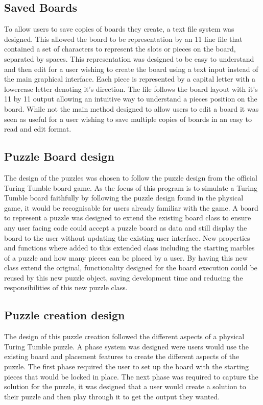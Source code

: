 \documentclass{l4proj}
\begin{document}
\subsection{Saved Boards}
To allow users to save copies of boards they create, a text file system was designed. This allowed the board to be representation by an 11 line file that contained a set of characters to represent the slots or pieces on the board, separated by spaces. This representation was designed to be easy to understand and then edit for a user wishing to create the board using a text input instead of the main graphical interface. Each piece is represented by a capital letter with a lowercase letter denoting it's direction. The file follows the board layout with it's 11 by 11 output allowing an intuitive way to understand a pieces position on the board. While not the main method designed to allow users to edit a board it was seen as useful for a user wishing to save multiple copies of boards in an easy to read and edit format.

\subsection{Puzzle Board design}
The design of the puzzles was chosen to follow the puzzle design from the official Turing Tumble board game. As the focus of this program is to simulate a Turing Tumble board faithfully by following the puzzle design found in the physical game, it would be recognisable for users already familiar with the game. A board to represent a puzzle was designed to extend the existing board class to ensure any user facing code could accept a puzzle board as data and still display the board to the user without updating the existing user interface. New properties and functions where added to this extended class including the starting marbles of a puzzle and how many pieces can be placed by a user. By having this new class extend the original, functionality designed for the board execution could be reused by this new puzzle object, saving development time and reducing the responsibilities of this new puzzle class. 

\subsection{Puzzle creation design}
The design of this puzzle creation followed the different aspects of a physical Turing Tumble puzzle. A phase system was designed were users would use the existing board and placement features to create the different aspects of the puzzle. The first phase required the user to set up the board with the starting pieces that would be locked in place. The next phase was required to capture the solution for the puzzle, it was designed that a user would create a solution to their puzzle and then play through it to get the output they wanted. 
\end{document}
